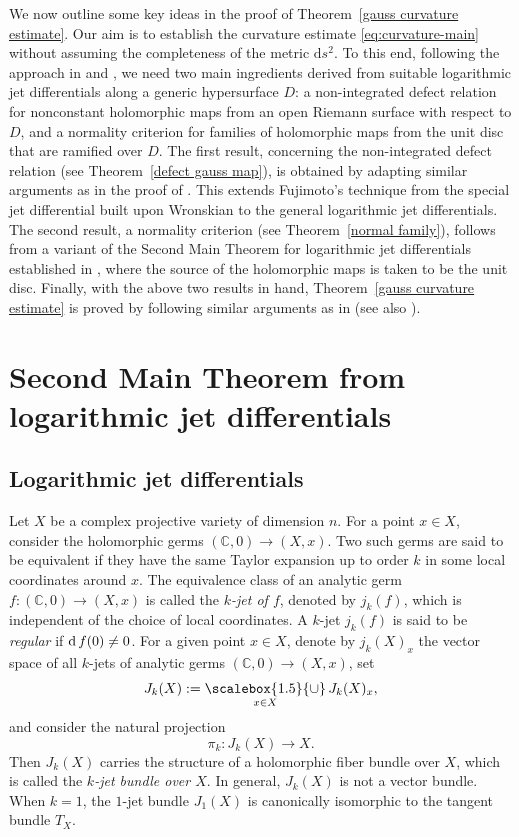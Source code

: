 \documentclass[english, 12pt]{amsart}
\newcommand{\medcup}{\mathbin{\scalebox{1.5}{\ensuremath{\cup}}}}
\DeclareMathOperator{\dif}{\text{\normalfont d}}
\theoremstyle{plain}
\theoremstyle{remark}
\numberwithin{equation}{section}
\theoremstyle{plain}
\theoremstyle{named}
\begin{document}
We now outline some key ideas in the proof of Theorem~\ref{gauss curvature estimate}. Our aim is to establish the curvature estimate \eqref{eq:curvature-main} without assuming the completeness of the metric $\mathrm{d}s^2$. To this end, following the approach in \cite{Chen-Li-Liu-Ru21} and \cite{Quang2023}, we need two main ingredients derived from suitable logarithmic jet differentials along a generic hypersurface $D$: a non-integrated defect relation for nonconstant holomorphic maps from an open Riemann surface with respect to $D$, and a normality criterion for families of holomorphic maps from the unit disc that are ramified over $D$. The first result, concerning the non-integrated defect relation (see Theorem~\ref{defect gauss map}), is obtained by adapting similar arguments as in the proof of \cite[Theorem 1.5]{Cai-Ru-Yang25}. This extends Fujimoto's technique \cite{Fujimoto83_2} from the special jet differential built upon Wronskian  to the general logarithmic jet differentials. The second result, a normality criterion (see Theorem~\ref{normal family}), follows from a variant of the Second Main Theorem for logarithmic jet differentials established in \cite{Huynh-Vu-Xie-2017}, where the source of the holomorphic maps is taken to be the unit disc. Finally, with the above two results in hand, Theorem~\ref{gauss curvature estimate} is proved by following similar arguments as in \cite{Chen-Li-Liu-Ru21} (see also \cite{Quang2023}).


\section{Second Main Theorem from logarithmic jet differentials}
\subsection{Logarithmic jet differentials}
Let $X$ be a complex projective variety of dimension $n$. For a point $x\in X$, consider the holomorphic germs $(\mathbb{C},0)\rightarrow (X,x)$. Two such germs are said to be equivalent if they have the same Taylor expansion up to order $k$ in some local coordinates around $x$. The equivalence class of an analytic germ $f\colon (\mathbb{C},0)\rightarrow (X,x)$ is called the {\sl $k$-jet of $f$}, denoted by $j_k(f)$, which is independent of the choice of local coordinates. A $k$-jet $j_k(f)$ is said to be {\sl regular} if $\dif f(0)\not=0$. For a given point $x\in X$, denote by $j_k(X)_x$ the vector space of all $k$-jets of analytic germs $(\mathbb{C},0)\rightarrow (X,x)$, set
\[
J_k(X)
:=
\underset{x\in X}{\medcup}\,J_k(X)_x,
\]
and consider the natural projection
\[
\pi_k\colon J_k(X)\rightarrow X.
\]
Then $J_k(X)$ carries the structure of a holomorphic fiber bundle over $X$, which is called the {\sl $k$-jet bundle over $X$}. In general, $J_k(X)$ is not a vector bundle. When $k=1$, the $1$-jet bundle $J_1(X)$ is canonically isomorphic to the tangent bundle $T_X$.
\end{document}
